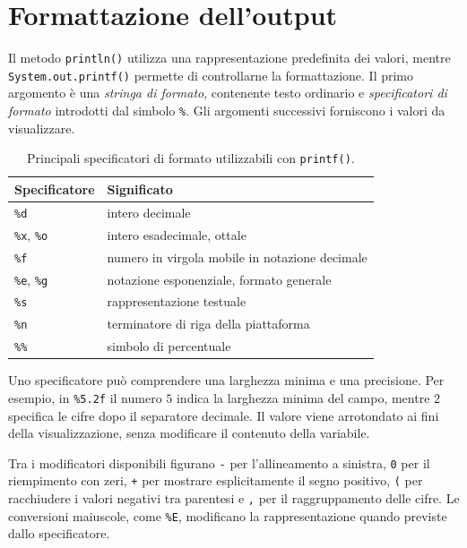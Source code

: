 \section{Formattazione dell'output}
\label{sec:fi-java-printf}

Il metodo \texttt{println()} utilizza una rappresentazione
predefinita dei valori, mentre \texttt{System.out.printf()}
permette di controllarne la formattazione. Il primo argomento
è una \emph{stringa di formato}, contenente testo ordinario
e \emph{specificatori di formato} introdotti dal simbolo
\texttt{\%}. Gli argomenti successivi forniscono i valori
da visualizzare.

\begin{table}[htbp]
  \centering
  \begin{tabular}{ll}
    \hline
    Specificatore & Significato \\
    \hline
    \texttt{\%d} & intero decimale \\
    \texttt{\%x}, \texttt{\%o} & intero esadecimale, ottale \\
    \texttt{\%f} & numero in virgola mobile in notazione decimale \\
    \texttt{\%e}, \texttt{\%g} & notazione esponenziale, formato generale \\
    \texttt{\%s} & rappresentazione testuale \\
    \texttt{\%n} & terminatore di riga della piattaforma \\
    \texttt{\%\%} & simbolo di percentuale \\
    \hline
  \end{tabular}
  \caption{Principali specificatori di formato utilizzabili con
  \texttt{printf()}.}
  \label{tab:fi-java-formati}
\end{table}

Uno specificatore può comprendere una larghezza minima e una
precisione. Per esempio, in \lstinline|%5.2f| il numero
\(5\) indica la larghezza minima del campo, mentre \(2\)
specifica le cifre dopo il separatore decimale.
Il valore viene arrotondato ai fini della visualizzazione,
senza modificare il contenuto della variabile.

Tra i modificatori disponibili figurano \lstinline|-|
per l'allineamento a sinistra, \lstinline|0| per il
riempimento con zeri, \lstinline|+| per mostrare
esplicitamente il segno positivo, \lstinline|(| per
racchiudere i valori negativi tra parentesi e
\lstinline|,| per il raggruppamento delle cifre.
Le conversioni maiuscole, come \lstinline|%E|,
modificano la rappresentazione quando previste
dallo specificatore.

